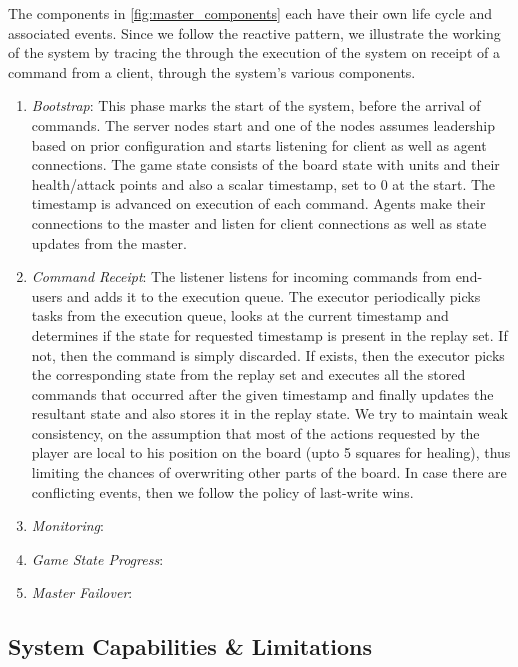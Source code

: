 \documentclass[a4paper]{IEEEtran}
\begin{document}
  The components in \autoref{fig:master_components} each have their own life cycle and associated events. Since we follow the reactive pattern, we illustrate the working of the system by tracing the through the execution of the system on receipt of a command from a client, through the system's various components.
  
  \begin{enumerate}
    \item \emph{Bootstrap}: This phase marks the start of the system, before the arrival of commands. The server nodes start and one of the nodes assumes leadership based on prior configuration and starts listening for client as well as agent connections. The game state consists of the board state with units and their health/attack points and also a scalar timestamp, set to 0 at the start. The timestamp is advanced on execution of each command. Agents make their connections to the master and listen for client connections as well as state updates from the master. 
  
    \item \emph{Command Receipt}: The listener listens for incoming commands from end-users and adds it to the execution queue. The executor periodically picks tasks from the execution queue, looks at the current timestamp and determines if the state for requested timestamp is present in the replay set. If not, then the command is simply discarded. If exists, then the executor picks the corresponding state from the replay set and executes all the stored commands that occurred after the given timestamp and finally updates the resultant state and also stores it in the replay state. We try to maintain weak consistency, on the assumption that most of the actions requested by the player are local to his position on the board (upto 5 squares for healing), thus limiting the chances of overwriting other parts of the board. In case there are conflicting events, then we follow the policy of last-write wins. 

    \item \emph{Monitoring}:

    \item \emph{Game State Progress}:

    \item \emph{Master Failover}:
 
  \end{enumerate}
  
  \subsection{System Capabilities \& Limitations}
  
\end{document}
